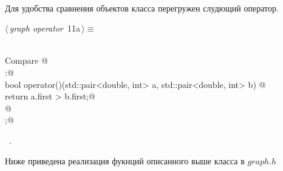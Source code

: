 \documentclass[12pt]{article}
\begin{document}
\paragraph{}
Для удобства сравнения объектов класса перегружен слудющий оператор.
\begin{flushleft} \small
\begin{minipage}{\linewidth}\label{scrap20}\raggedright\small
{} $\langle\,${\itshape graph operator}\nobreak\ {\footnotesize {11a}}$\,\rangle\equiv$
\vspace{-1ex}
\begin{list}{}{} \item
\mbox{}\verb@@\\
\mbox{}\verb@class Compare {@\\
\mbox{}\verb@public:@\\
\mbox{}\verb@    bool operator()(std::pair<double, int> a, std::pair<double, int> b) {@\\
\mbox{}\verb@        return a.first > b.first;@\\
\mbox{}\verb@    }@\\
\mbox{}\verb@};@\\
\mbox{}\verb@@{\NWsep}
\end{list}
\vspace{-1.5ex}
\footnotesize
\begin{list}{}{\setlength{\itemsep}{-\parsep}\setlength{\itemindent}{-\leftmargin}}
\item \NWtxtMacroRefIn\ .

\item{}
\end{list}
\end{minipage}\vspace{4ex}
\end{flushleft}
Ниже приведена реализация фукнций описанного выше класса в $graph.h$
\end{document}
